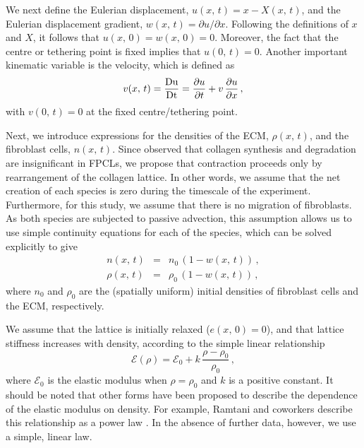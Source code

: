 We next define the Eulerian displacement, $u(x,\,t) = x - X(x,\,t)$, and the Eulerian displacement gradient, $w(x,\,t) = {\partial u}/{\partial x}$. Following the definitions of $x$ and $X$, it follows that $u(x,\,0) = w(x,\,0) = 0$. Moreover, the fact that the centre or tethering point is fixed implies that $u(0,\,t) = 0$. Another important kinematic variable is the velocity, which is defined as
\begin{equation}
v(x,\,t) = \frac{\rm{D}u}{\rm{D}t} = \frac{\partial u}{\partial t} + v \, \frac{\partial u}{\partial x}\,,
\label{eq:velocity}
\end{equation}
with $v(0,\,t) = 0$ at the fixed centre/tethering point.

Next, we introduce expressions for the densities of the ECM, $\rho(x,\,t)$, and the fibroblast cells, $n(x,\,t)$. Since \citet{Guidry1985} observed that collagen synthesis and degradation are insignificant in FPCLs, we propose that contraction proceeds only by rearrangement of the collagen lattice. In other words, we assume that the net creation of each species is zero during the timescale of the experiment. Furthermore, for this study, we assume that there is no migration of fibroblasts. As both species are subjected to passive advection, this assumption allows us to use simple continuity equations for each of the species, which can be solved explicitly \citep{Clement1978} to give
\begin{eqnarray}
\label{eq:n}
n(x,\,t)&=&n_{0}\,(1-w(x,\,t))\,,\\
\label{eq:rho}
\rho(x,\,t)&=&\rho_{0}\,(1-w(x,\,t))\,,
\end{eqnarray}
where $n_{0}$ and $\rho_{0}$ are the (spatially uniform) initial densities of fibroblast cells and the ECM, respectively.

We assume that the lattice is initially relaxed ($e(x,\,0)=0$), and that lattice stiffness increases with density, according to the simple linear relationship
\[
 \mathcal{E}(\rho)= \mathcal{E}_0 + k \, \frac{\rho - \rho_0}{\rho_0}\,,
\]
where $\mathcal{E}_0$ is the elastic modulus when $\rho = \rho_0$ and $k$ is a positive constant. It should be noted that other forms have been proposed to describe the dependence of the elastic modulus on density. For example, Ramtani and coworkers describe this relationship as a power law \citep{Ramtani2002,Ramtani2004}. In the absence of further data, however, we use a simple, linear law.

